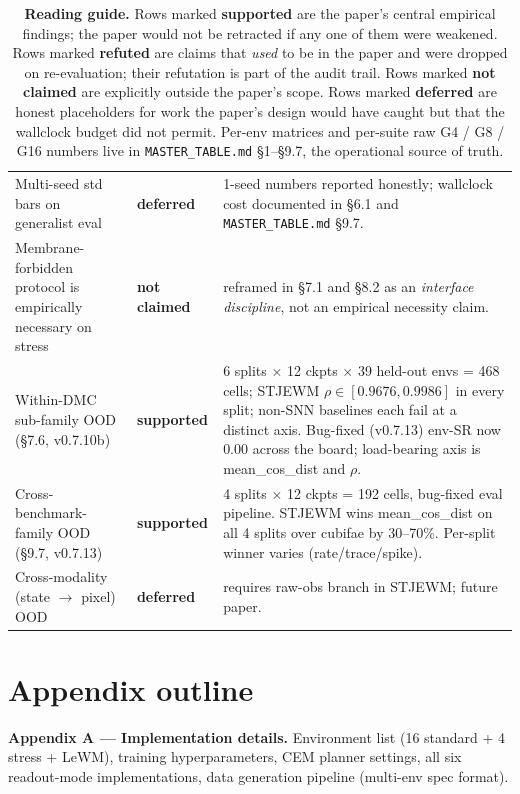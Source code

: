 \documentclass{article}
\begin{document}
\begin{table}[ht]
\begin{tabular}{lp{3cm}p{8cm}}
  \\
Multi-seed std bars on generalist eval
  & \textbf{deferred}
  & 1-seed numbers reported honestly; wallclock cost documented in \S 6.1 and \texttt{MASTER\_TABLE.md} \S 9.7.
  \\
Membrane-forbidden protocol is empirically necessary on stress
  & \textbf{not claimed}
  & reframed in \S 7.1 and \S 8.2 as an \emph{interface discipline}, not an empirical necessity claim.
  \\
Within-DMC sub-family OOD (\S7.6, v0.7.10b)
  & \textbf{supported}
  & 6 splits $\times$ 12 ckpts $\times$ 39 held-out envs = 468 cells; STJEWM $\rho \in [0.9676, 0.9986]$ in every split; non-SNN baselines each fail at a distinct axis. Bug-fixed (v0.7.13) env-SR now 0.00 across the board; load-bearing axis is mean\_cos\_dist and $\rho$.
  \\
Cross-benchmark-family OOD (\S9.7, v0.7.13)
  & \textbf{supported}
  & 4 splits $\times$ 12 ckpts = 192 cells, bug-fixed eval pipeline. STJEWM wins mean\_cos\_dist on all 4 splits over cubifae by 30--70\%. Per-split winner varies (rate/trace/spike).
  \\
Cross-modality (state $\to$ pixel) OOD
  & \textbf{deferred}
  & requires raw-obs branch in STJEWM; future paper.
  \\
\bottomrule
\end{tabular}
\caption{\textbf{Reading guide.} Rows marked \textbf{supported} are
the paper's central empirical findings; the paper would not be retracted
if any one of them were weakened. Rows marked \textbf{refuted} are claims
that \emph{used} to be in the paper and were dropped on re-evaluation;
their refutation is part of the audit trail. Rows marked \textbf{not
claimed} are explicitly outside the paper's scope. Rows marked
\textbf{deferred} are honest placeholders for work the paper's design
would have caught but that the wallclock budget did not permit. Per-env
matrices and per-suite raw G4 / G8 / G16 numbers live in
\texttt{MASTER\_TABLE.md} §1--§9.7, the operational source of truth.}
\label{tab:claim-control}
\end{table}

\appendix

\section*{Appendix outline}

\textbf{Appendix A --- Implementation details.} Environment list (16
standard + 4 stress + LeWM), training hyperparameters, CEM planner
settings, all six readout-mode implementations, data generation
pipeline (multi-env spec format).
\end{document}
